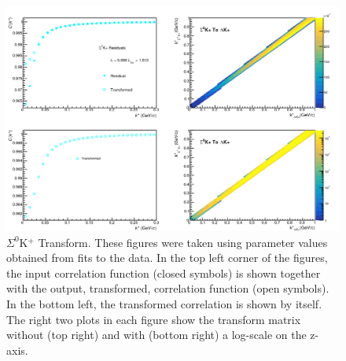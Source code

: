 \documentclass[../AnalysisNoteJBuxton.tex]{subfiles}
\begin{document}
\begin{figure}[h]
  \centering
  \includegraphics[width=\textwidth]{5_Fitting/Figures/Residuals_LamKchP_0010_Sig0KchP_MomResCrctn_NonFlatBgdCrctn_10Res_PrimMaxDecay4fm_UsingXiDataAndCoulombOnly.pdf}
  \caption[$\Sigma^{0}$K$^{+}$ Transform]{$\Sigma^{0}$K$^{+}$ Transform.  These figures were taken using parameter values obtained from fits to the data.  In the top left corner of the figures, the input correlation function (closed symbols) is shown together with the output, transformed, correlation function (open symbols).  In the bottom left, the transformed correlation is shown by itself.  The right two plots in each figure show the transform matrix without (top right) and with (bottom right) a log-scale on the z-axis.}
  \label{fig:Sig0KchPtoLamKchPTransform}
\end{figure}
\end{document}
